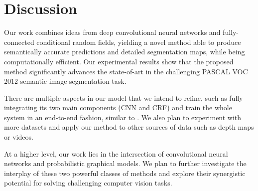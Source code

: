 \section{Discussion}
\label{sec:discussion}

Our work combines ideas from deep convolutional neural networks and
fully-connected conditional random fields, yielding a novel method able to
produce semantically accurate predictions and detailed segmentation maps,
while being computationally efficient. Our experimental results show that the
proposed method significantly advances the state-of-art in the challenging
PASCAL VOC 2012 semantic image segmentation task.

There are multiple aspects in our model that we intend to refine, such as
fully integrating its two main components (CNN and CRF) and train the whole
system in an end-to-end fashion, similar to \citet{Koltun13, chen2014learning}.
We also plan to experiment with more datasets and apply our method to other 
sources of data such as depth maps or videos.

At a higher level, our work lies in the intersection of convolutional neural
networks and probabilistic graphical models. We plan to further investigate
the interplay of these two powerful classes of methods and explore their
synergistic potential for solving challenging computer vision tasks.
